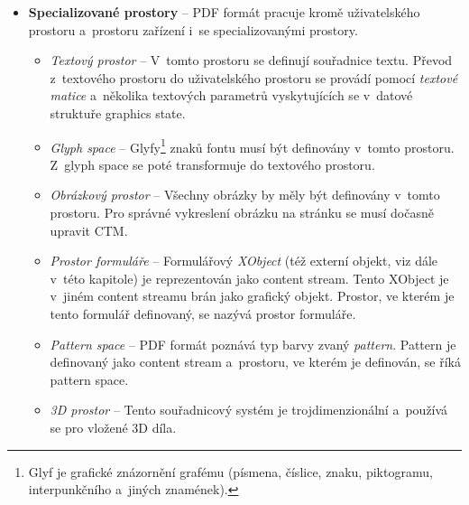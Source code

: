 \begin{itemize}
    \item \textbf{Specializované prostory} -- PDF formát pracuje kromě
    uživatelského prostoru a~prostoru zařízení i~se specializovanými prostory.
    \begin{itemize}
        \item \emph{Textový prostor} -- V~tomto prostoru se definují souřadnice
        textu. Převod z~textového prostoru do uživatelského prostoru se provádí
        pomocí \emph{textové matice} a~několika textových parametrů vyskytujících
        se v~datové struktuře graphics state.

        \item \emph{Glyph space} -- Glyfy\footnote{
            Glyf je grafické znázornění grafému (písmena, číslice, znaku, piktogramu, interpunkčního a~jiných znamének).
        }
        znaků fontu musí být definovány v~tomto
        prostoru. Z~glyph space se poté transformuje do textového prostoru.
        
        \item \emph{Obrázkový prostor} -- Všechny obrázky by měly být definovány
        v~tomto prostoru. Pro správné vykreslení obrázku na stránku se musí dočasně
        upravit CTM.

        \item \emph{Prostor formuláře} -- Formulářový \emph{XObject} (též externí
        objekt, viz dále v~této kapitole) je
        reprezentován jako content stream. Tento XObject je v~jiném content streamu
        brán jako grafický objekt. Prostor, ve kterém je tento formulář definovaný,
        se nazývá prostor formuláře.

        \item \emph{Pattern space} -- PDF formát poznává typ barvy zvaný
        \emph{pattern}. Pattern je definovaný jako content stream a~prostoru, ve
        kterém je definován, se říká pattern space.
        
        \item \emph{3D prostor} -- Tento souřadnicový systém je
        trojdimenzionální a~používá se pro vložené 3D díla.
    \end{itemize}
\end{itemize}

